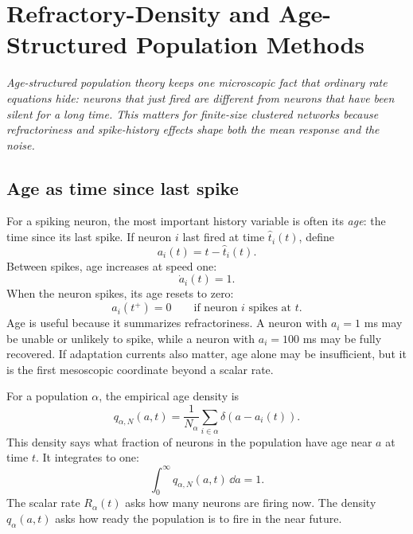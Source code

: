 \chapter{Refractory-Density and Age-Structured Population Methods}
\label{ch:refractory-density-age-structured}

\textit{Age-structured population theory keeps one microscopic fact that ordinary rate equations hide: neurons that just fired are different from neurons that have been silent for a long time. This matters for finite-size clustered networks because refractoriness and spike-history effects shape both the mean response and the noise.}

\section{Age as time since last spike}
\label{sec:age-time-since-last-spike}

For a spiking neuron, the most important history variable is often its \emph{age}: the time since its last spike. If neuron $i$ last fired at time $\hat t_i(t)$, define
%
\begin{equation}
  a_i(t)=t-\hat t_i(t).
  \label{eq:neuron-age}
\end{equation}
%
Between spikes, age increases at speed one:
%
\begin{equation}
  \dot a_i(t)=1.
  \label{eq:age-increase}
\end{equation}
%
When the neuron spikes, its age resets to zero:
%
\begin{equation}
  a_i(t^+)=0
  \qquad \text{if neuron } i \text{ spikes at } t.
  \label{eq:age-reset}
\end{equation}
%
Age is useful because it summarizes refractoriness. A neuron with $a_i=1$ ms may be unable or unlikely to spike, while a neuron with $a_i=100$ ms may be fully recovered. If adaptation currents also matter, age alone may be insufficient, but it is the first mesoscopic coordinate beyond a scalar rate.

For a population $\alpha$, the empirical age density is
%
\begin{equation}
  q_{\alpha,N}(a,t)
  =
  \frac{1}{N_\alpha}
  \sum_{i\in\alpha}\delta(a-a_i(t)).
  \label{eq:empirical-age-density}
\end{equation}
%
This density says what fraction of neurons in the population have age near $a$ at time $t$. It integrates to one:
%
\begin{equation}
  \int_0^\infty q_{\alpha,N}(a,t)\,\dd a=1.
  \label{eq:age-density-normalization}
\end{equation}
%
The scalar rate $R_\alpha(t)$ asks how many neurons are firing now. The density $q_\alpha(a,t)$ asks how ready the population is to fire in the near future.

